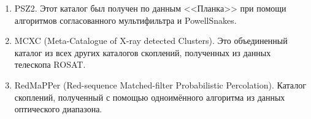 \begin{enumerate}
	\item PSZ2. Этот каталог был получен по данным <<Планка>>  при помощи алгоритмов 
	согласованного мультифильтра и PowellSnakes.
	\item MCXC (Meta-Catalogue of X-ray detected Clusters). Это объединенный каталог из всех 
	других каталогов скоплений, полученных из данных телескопа ROSAT.
	\item RedMaPPer (Red-sequence Matched-filter Probabilistic Percolation). Каталог скоплений, 
	полученный с помощью одноимённого алгоритма из данных оптического диапазона.
\end{enumerate}



